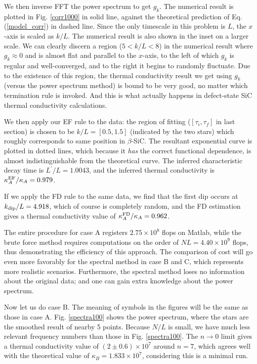 We then inverse FFT the power spectrum to get $g_k$. The numerical
result is plotted in Fig. \ref{corr1000} in solid line, against the
theoretical prediction of Eq. (\ref{model_corr}) in dashed line.
Since the only timescale in this problem is $L$, the $x$-axis is
scaled as $k/L$. The numerical result is also shown in the inset on a
larger scale. We can clearly discern a region ($5<k/L<8$) in the
numerical result where $g_k \approx 0$ and is almost flat and parallel
to the $x$-axis, to the left of which $g_k$ is regular and
well-converged, and to the right it begins to randomly fluctuate.  Due
to the existence of this region, the thermal conductivity result we
get using $g_k$ (versus the power spectrum method) is bound to be very
good, no matter which termination rule is invoked. And this is what
actually happens in defect-state SiC thermal conductivity
calculations.

We then apply our EF rule to the data: the region of fitting
($[\tau_i, \tau_f]$ in last section) is chosen to be $k/L = [0.5,
1.5]$ (indicated by the two stars) which roughly corresponds to same
position in $\beta$-SiC. The resultant exponential curve is plotted in
dotted lines, which because it {\em has} the correct functional
dependence, is almost indistinguishable from the theoretical curve.
The inferred characteristic decay time is $L^\prime / L = 1.0043$, and
the inferred thermal conductivity is $\kappa_{A}^{\rm EF} / \kappa_A =
0.979$.

If we apply the FD rule to the same data, we find that the first dip
occurs at $k_{\rm dip} / L = 4.918$, which of course is completely
random, and the FD estimation gives a thermal conductivity value of
$\kappa_{A}^{\rm FD} / \kappa_A = 0.962$.

The entire procedure for case A registers $2.75 \times 10^8$ flops on
Matlab, while the brute force method requires computations on the
order of $NL = 4.40 \times 10^9$ flops, thus demonstrating the
efficiency of this approach. The comparison of cost will go even more
favorably for the spectral method in case B and C, which represents
more realistic scenarios.  Furthermore, the spectral method loses no
information about the original data; and one can gain extra knowledge
about the power spectrum.

Now let us do case B.  The meaning of symbols in the figures will be
the same as those in case A.  Fig. \ref{spectra100} shows the power
spectrum, where the stars are the smoothed result of nearby 5 points.
Because $N/L$ is small, we have much less relevant frequency numbers
than those in Fig. \ref{spectra100}. The $n\rightarrow 0$ limit gives
a thermal conductivity value of $(2 \pm 0.6) \times 10^7$ around
$n=7$, which agrees well with the theoretical value of $\kappa_{B} =
1.833 \times 10^7$, considering this is a minimal run.

